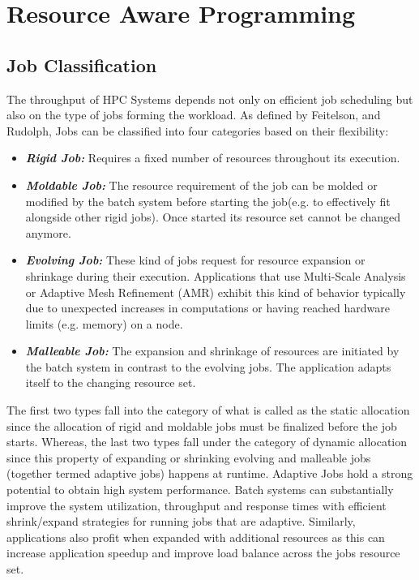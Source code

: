 \section{Resource Aware Programming}
\subsection{Job Classification}
The throughput of HPC Systems depends not only on efficient job scheduling but also on the type of jobs forming the workload. As defined by Feitelson, and Rudolph\cite{rudolph}, Jobs can be classified into four categories based on their flexibility:
\begin{itemize}
\item \textbf{\textit{Rigid Job:}} Requires a fixed number of resources throughout its execution.
\item \textbf{\textit{Moldable Job: }} The resource requirement of the job can be molded or modified by the batch system before starting the job(e.g. to effectively fit alongside other rigid jobs). Once started its resource set cannot be changed anymore.
\item \textbf{\textit{Evolving Job: }} These kind of jobs request for resource expansion or shrinkage during their execution. Applications that use Multi-Scale Analysis or Adaptive Mesh Refinement (AMR) exhibit this kind of behavior typically due to unexpected increases in computations or having reached hardware limits (e.g. memory) on a node.
\item \textbf{\textit{Malleable Job: }} The expansion and shrinkage of resources are initiated by the batch system in contrast to the evolving jobs. The application adapts itself to the changing resource set.
\end{itemize}
The first two types fall into the category of what is called as the static allocation since the allocation of rigid and moldable jobs must be finalized before the job starts. Whereas, the last two types fall under the category of dynamic allocation since this property of expanding or shrinking evolving and malleable jobs (together termed adaptive jobs) happens at runtime. Adaptive Jobs hold a strong potential to obtain high system performance. Batch systems can substantially improve the system utilization, throughput and response times with efficient shrink/expand strategies for running jobs that are adaptive. Similarly, applications also profit when expanded with additional resources as this can increase application speedup and improve load balance across the job\textquotesingle s resource set.
